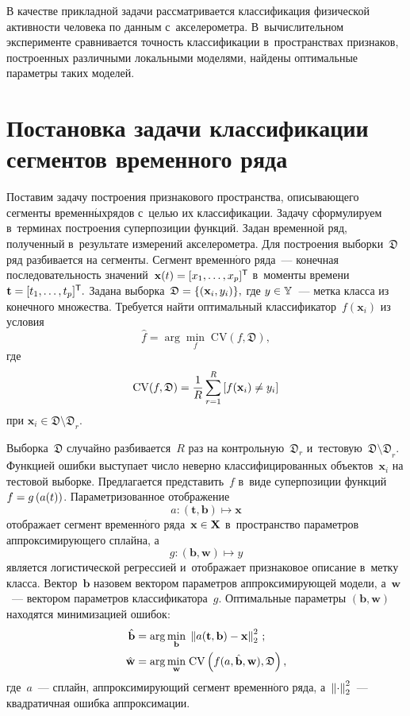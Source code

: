 \begin{multicols}{2}
В качестве прикладной задачи рассматривается классификация физической активности 
человека по данным с~акселерометра. В~вычислительном эксперименте сравнивается 
точность классификации в~пространствах признаков, построенных различными 
локальными моделями, найдены оптимальные параметры таких моделей.


\section{Постановка задачи классификации сегментов временного ряда}

Поставим задачу  построения признакового пространства, описывающего сегменты 
временн$\acute{\mbox{ы}}$х\linebreak рядов с~целью их классификации. 
Задачу сформулируем в~терминах построения суперпозиции функций. 
Задан временной ряд, полученный в~результате измерений акселерометра.
Для построения  выборки~$\mathfrak{D}$  ряд разбивается на сегменты.
Сегмент временн$\acute{\mbox{о}}$го ряда~--- конечная последовательность 
значений~$\mathbf{x}(t)\hm=[x_1,\dots,x_p]^\mathsf{T}$ в~моменты 
времени $\mathbf{t} \hm= [t_1, \dots, t_p]^\mathsf{T}.$ 
Задана выборка~$\mathfrak{D}\hm=\{(\mathbf{x}_i,y_i)\},$ где
$y\hm\in \mathbb{Y}$~--- метка класса  из конечного множества.
Требуется найти оптимальный классификатор~$f(\mathbf{x}_i)$ из условия
\begin{equation*}
\hat{f}={\mathop{\mathrm{arg}}\underset{f}{\min}} 
\;\mathrm{CV}\left(f,\mathfrak{D}\right),
\end{equation*}
где
$$
\mathrm{CV} (f,\mathfrak{D})=\displaystyle\frac{\displaystyle 1\mathstrut}{\displaystyle R\mathstrut}\sum\limits_{r=1}^R \left[f(\mathbf{x}_i)\neq y_i\right]
$$
при $\mathbf{x}_i\in \mathfrak{D\setminus D}_r$.

Выборка~$\mathfrak{D}$ случайно разбивается~$R$ раз на контрольную~$\mathfrak{D}_r$ 
и~тестовую~$\mathfrak{D\setminus D}_r$. Функцией ошибки выступает 
число неверно классифицированных объектов~$\mathbf{x}_i$ на тестовой выборке. 
Предлагается представить~$f$ в~виде суперпозиции функций~$f\hm=g\left(a(t)\right)$. 
Параметризованное отображение
$$
a: (\mathbf{t},\mathbf{b}) \mapsto \mathbf{x}
$$
отображает сегмент временн$\acute{\mbox{о}}$го ряда~$\mathbf{x}\hm\in \mathbf{X}$ 
в~пространство параметров аппроксимирующего сплайна, а 
$$
g:( \mathbf{b},\mathbf{w}) \mapsto y
$$ 
является логистической регрессией и~отображает признаковое описание в~метку класса. 
Вектор~$\mathbf{b}$ назовем вектором параметров аппроксимирующей модели, 
а~$\mathbf{w}$~--- вектором параметров классификатора~$g$.
Оптимальные параметры $(\mathbf{b},\mathbf{w})$ находятся минимизацией ошибок:
\begin{align}
\label{1-str}
\hat{\mathbf{b}}&=
\mathrm{\mathop{\mathrm{arg}}\underset{\mathbf{b}}\min}\;\left\Vert a(\mathbf{t, b}) - \mathbf{x}\right\Vert_2^2\,;
\\
\hat{\mathbf{w}} &= \mathrm{\mathop{\mathrm{arg}}\underset{\mathbf{w}}{\min}} \;\mathrm{CV}
\left(f(a,\hat{\mathbf{b}}, \mathbf{w}),\mathfrak{D}\right),\notag
\end{align}
где~$a$~--- сплайн, аппроксимирующий сегмент временн$\acute{\mbox{о}}$го ряда, 
а~$\left\Vert\cdot\right\Vert_2^2$~--- квадратичная ошибка аппроксимации.


\end{multicols}
